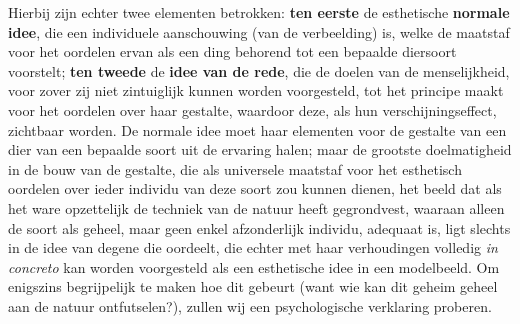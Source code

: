 Hierbij zijn echter twee elementen betrokken: \textbf{ten eerste} de esthetische \textbf{normale idee}, die een individuele aanschouwing (van de verbeelding) is, welke de maatstaf voor het oordelen ervan als een ding behorend tot een bepaalde diersoort voorstelt; \textbf{ten tweede} de \textbf{idee van de rede}, die de doelen van de menselijkheid, voor zover zij niet zintuiglijk kunnen worden voorgesteld, tot het principe maakt voor het oordelen over haar gestalte, waardoor deze, als hun verschijningseffect, zichtbaar worden. De normale idee moet haar elementen voor de gestalte van een dier van een bepaalde soort uit de ervaring halen; maar de grootste doelmatigheid in de bouw van de gestalte, die als universele maatstaf voor het esthetisch oordelen over ieder individu van deze soort zou kunnen dienen, het beeld dat als het ware opzettelijk de techniek van de natuur heeft gegrondvest, waaraan alleen de soort als geheel, maar geen enkel afzonderlijk individu, adequaat is, ligt slechts in de idee van degene die oordeelt, die echter met haar verhoudingen volledig \emph{in concreto} kan worden voorgesteld als een esthetische idee in een modelbeeld. Om enigszins begrijpelijk te maken hoe dit gebeurt (want wie kan dit geheim geheel aan de natuur ontfutselen?), zullen wij een psychologische verklaring proberen.

